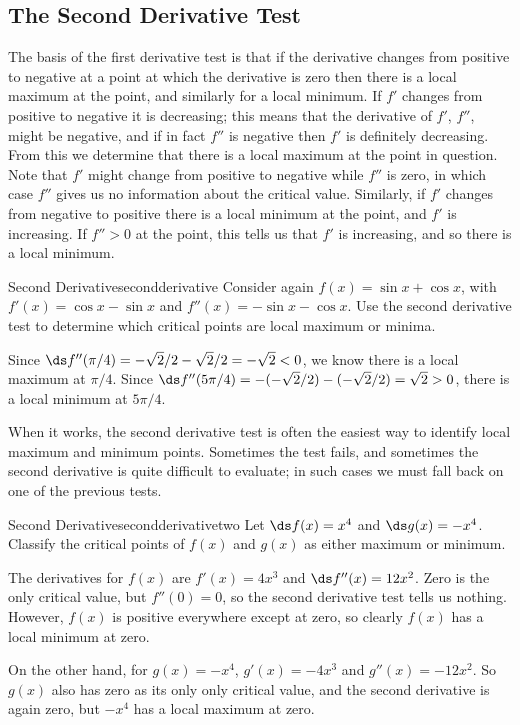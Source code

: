 \subsection{The Second Derivative Test}\label{sec:SecondDer}
The basis of the first derivative test is that if the derivative
changes from positive to negative at a point at which the derivative
is zero then there is a local maximum at the point, and similarly for
a local minimum. If $f'$ changes from positive to negative it is
decreasing; this means that the derivative of $f'$, $f''$, might be negative,
and if in fact $f''$ is negative then $f'$ is definitely
decreasing. From this we determine that there is a local maximum at the point in question. Note
that $f'$ might change from positive to negative while $f''$ is
zero, in which case $f''$ gives us no information about the critical
value. Similarly, if $f'$ changes from negative to positive there is a
local minimum at the point, and $f'$ is increasing. If $f''>0$ at the
point, this tells us that $f'$ is increasing, and so there is a local
minimum.

\begin{example}{Second Derivative}{secondderivative}
Consider again $f(x)=\sin x + \cos x$,  with $f'(x)=\cos x-\sin x$ and
$ f''(x)=-\sin x -\cos x$. Use the second derivative test to determine which critical points are local maximum or minima.
\end{example}
\begin{solution}
Since $\ds f''(\pi/4)=-\sqrt{2}/2-\sqrt2/2=-\sqrt2<0$,
we know there is a local maximum at $\pi/4$. Since
$\ds f''(5\pi/4)=-(-\sqrt{2}/2)-(-\sqrt2/2)=\sqrt2>0$, there is a local
minimum at $5\pi/4$.
\end{solution}

When it works, the second derivative test is often the easiest way to
identify local maximum and minimum points. Sometimes the test fails,
and sometimes the second derivative is quite difficult to evaluate; in
such cases we must fall back on one of the previous tests.

\begin{example}{Second Derivative}{secondderivativetwo}
Let $\ds f(x)=x^4$ and $\ds g(x)=-x^4$. Classify the critical points of $f(x)$ and $g(x)$ as either maximum or minimum.
\end{example}
\begin{solution}
The derivatives for $f(x)$ are $f'(x)=4x^3$ and $\ds f''(x)=12x^2$.
Zero is the only critical value, but $f''(0)=0$, so
the second derivative test tells us nothing. However, $f(x)$ is
positive everywhere except at zero, so clearly $f(x)$ has a local
minimum at zero.

On the other hand, for $g(x)=-x^4$, $g'(x)=-4x^3$ and $g''(x)=-12x^2$. So $g(x)$ also has zero
as its only only critical value, and the second derivative is again zero, but $-x^4$ has a local maximum at zero.
\end{solution}


